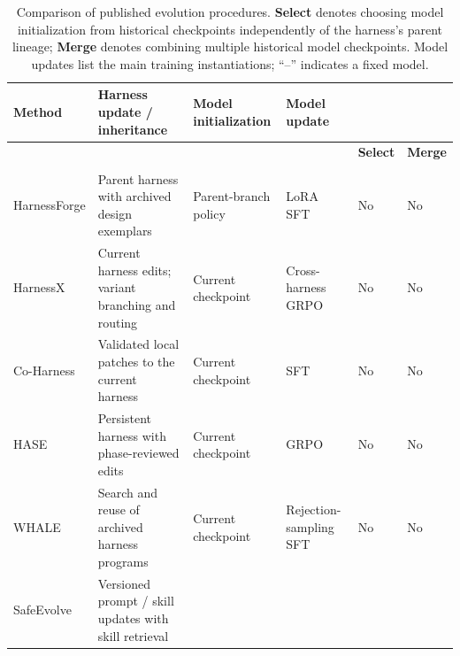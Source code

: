 \documentclass[11pt,a4paper]{article}
\begin{document}
\begin{table}[!t]
\centering
\scriptsize
\caption{Comparison of published evolution procedures. \textbf{Select} denotes choosing model initialization from historical checkpoints independently of the harness's parent lineage; \textbf{Merge} denotes combining multiple historical model checkpoints. Model updates list the main training instantiations; ``--'' indicates a fixed model.}
\label{tab:evolution-comparison}
\setlength{\tabcolsep}{3pt}
\renewcommand{\arraystretch}{1.13}
\begin{tabular}{@{}>{\raggedright\arraybackslash}p{}>{\raggedright\arraybackslash}p{}>{\raggedright\arraybackslash}p{}>{\raggedright\arraybackslash}p{}>{\centering\arraybackslash}p{}>{\centering\arraybackslash}p{}@{}}
\toprule
\textbf{Method} & \textbf{Harness update / inheritance} & \textbf{Model initialization} & \textbf{Model update} & \multicolumn{2}{c}{\textbf{Historical weights}} \\
\cmidrule(lr){5-6}
& & & & \textbf{Select} & \textbf{Merge} \\
\midrule
\multicolumn{6}{l}{\textit{Model--harness co-evolution}} \\
\addlinespace[2pt]
HarnessForge\newline \citep{chen2026harnessforge}
& Parent harness with archived design exemplars
& Parent-branch policy
& LoRA SFT & No & No \\
\addlinespace[3pt]
HarnessX\newline \citep{chen2026harnessx}
& Current harness edits; variant branching and routing
& Current checkpoint
& Cross-harness GRPO & No & No \\
\addlinespace[3pt]
Co-Harness\newline \citep{chen2026coharness}
& Validated local patches to the current harness
& Current checkpoint
& SFT & No & No \\
\addlinespace[3pt]
HASE\newline \citep{luo2026hase}
& Persistent harness with phase-reviewed edits
& Current checkpoint
& GRPO & No & No \\
\addlinespace[3pt]
WHALE\newline \citep{kim2026whale}
& Search and reuse of archived harness programs
& Current checkpoint
& Rejection-sampling SFT & No & No \\
\addlinespace[3pt]
SafeEvolve\newline \citep{mao2026safeevolve}
& Versioned prompt / skill updates with skill retrieval

\end{tabular}
\end{table}
\end{document}
